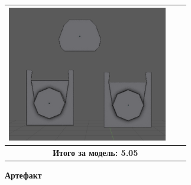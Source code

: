 \begin{longtable}{|p{4cm}|p{2.5cm}|p{7.5cm}|}
    \includegraphics[width=7cm]{src/poly_10} \\
    \hline
    \multicolumn{3}{|c|}{\textbf{Итого за модель: 5.05}} \\
    \hline
\end{longtable}

\begin{center}
    \textbf{Артефакт}
\end{center}


